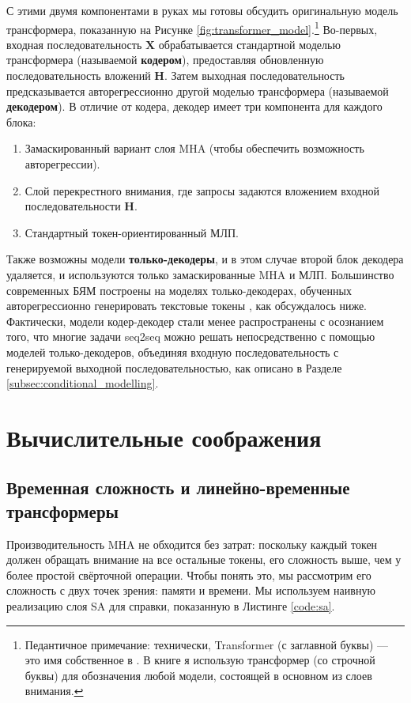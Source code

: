 С этими двумя компонентами в руках мы готовы обсудить оригинальную модель трансформера, показанную на Рисунке \ref{fig:transformer_model}.\footnote{Педантичное примечание: технически, Transformer (с заглавной буквы) — это имя собственное в \cite{vaswani2017attention}. В книге я использую трансформер (со строчной буквы) для обозначения любой модели, состоящей в основном из слоев внимания.} Во-первых, входная последовательность $\mathbf{X}$ обрабатывается стандартной моделью трансформера (называемой \textbf{кодером}), предоставляя обновленную последовательность вложений $\mathbf{H}$. Затем выходная последовательность предсказывается авторегрессионно другой моделью трансформера (называемой \textbf{декодером}). В отличие от кодера, декодер имеет три компонента для каждого блока:
%
\begin{enumerate}
\item Замаскированный вариант слоя MHA (чтобы обеспечить возможность авторегрессии).
\item Слой перекрестного внимания, где запросы задаются вложением входной последовательности $\mathbf{H}$.
\item Стандартный токен-ориентированный МЛП.
\end{enumerate}
%
Также возможны модели \textbf{только-декодеры}, и в этом случае второй блок декодера удаляется, и используются только замаскированные MHA и МЛП. Большинство современных БЯМ построены на моделях только-декодерах, обученных авторегрессионно генерировать текстовые токены \cite{radford2019language}, как обсуждалось ниже. Фактически, модели кодер-декодер стали менее распространены с осознанием того, что многие задачи seq2seq можно решать непосредственно с помощью моделей только-декодеров, объединяя входную последовательность с генерируемой выходной последовательностью, как описано в Разделе \ref{subsec:conditional_modelling}.

\section{Вычислительные соображения}

\subsection{Временная сложность и линейно-временные трансформеры}
\label{subsec:time_complexity_mha}

Производительность MHA не обходится без затрат: поскольку каждый токен должен обращать внимание на все остальные токены, его сложность выше, чем у более простой свёрточной операции. Чтобы понять это, мы рассмотрим его сложность с двух точек зрения: памяти и времени. Мы используем наивную реализацию слоя SA для справки, показанную в Листинге \ref{code:sa}.

